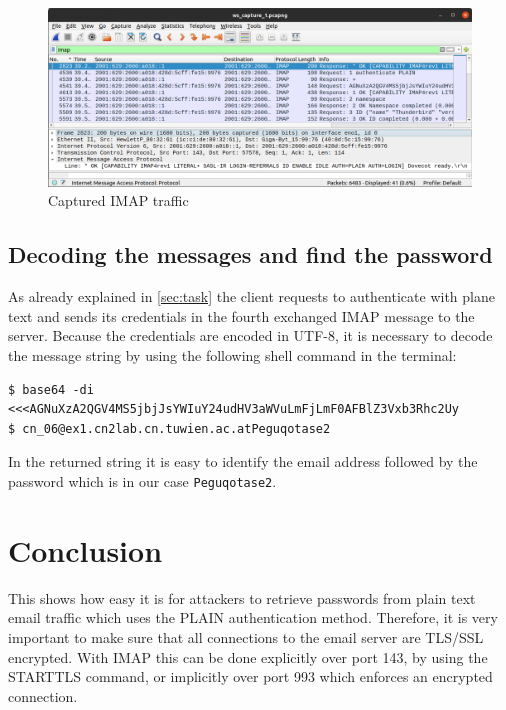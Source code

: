 \documentclass[parskip=full]{scrartcl}
\begin{document}
\begin{figure}[!ht]
	\centering %
	\includegraphics[width=\linewidth]{images/ws1.png} %
	\caption{Captured IMAP traffic} 
	\label{fig:ws} %
\end{figure} 

\subsection{Decoding the messages and find the password} \label{subsec:decode}
As already explained in \cref{sec:task} the client requests to authenticate with plane text and sends its credentials in the fourth exchanged IMAP message to the server. 
Because the credentials are encoded in UTF-8, it is necessary to decode the message string by using the following shell command in the terminal:
\begin{verbatim}
$ base64 -di <<<AGNuXzA2QGV4MS5jbjJsYWIuY24udHV3aWVuLmFjLmF0AFBlZ3Vxb3Rhc2Uy
$ cn_06@ex1.cn2lab.cn.tuwien.ac.atPeguqotase2
\end{verbatim}
In the returned string it is easy to identify the email address followed by the password which is in our case \verb|Peguqotase2|. 

\section{Conclusion}

This shows how easy it is for attackers to retrieve passwords from plain text email traffic which uses the PLAIN authentication method. Therefore, it is very important to make sure that all connections to the email server are TLS/SSL encrypted. With IMAP this can be done explicitly over port 143, by using the STARTTLS command, or implicitly over port 993 which enforces an encrypted connection.



\printbibliography

\end{document}
